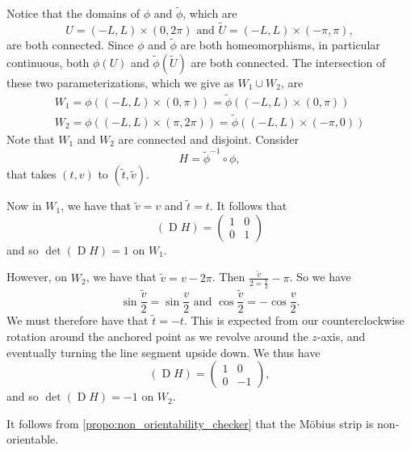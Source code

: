 \documentclass[notoc,notitlepage]{tufte-book}
\DeclareMathOperator{\D}{D}
\begin{document}
\begin{eg}
  \noindent
   Notice that the
  domains of $\phi$ and $\tilde{\phi}$, which are
  \begin{equation*}
    U = (-L, L) \times (0, 2 \pi) \text{ and } \tilde{U} = (-L, L) \times (-\pi, \pi),
  \end{equation*}
  are both connected. Since $\phi$ and $\tilde{\phi}$ are both homeomorphisms,
  in particular continuous, both $\phi(U)$ and $\tilde{\phi}(\tilde{U})$ are
  both connected. The intersection of these two parameterizations, which we give
  as $W_1 \cup W_2$, are
  \begin{gather*}
    W_1 = \phi((-L, L) \times (0, \pi)) = \tilde{\phi}((-L, L) \times (0, \pi)) \\
    W_2 = \phi((-L, L) \times (\pi, 2\pi)) = \tilde{\phi} ((-L, L) \times (-\pi, 0))
  \end{gather*}
  Note that $W_1$ and $W_2$ are connected and disjoint. Consider
  \begin{equation*}
    H = \tilde{\phi}^{-1} \circ \phi,
  \end{equation*}
  that takes $(t, v)$ to $(\tilde{t}, \tilde{v})$.

  Now in $W_1$, we have that $\tilde{v} = v$ and $\tilde{t} = t$. It follows
  that
  \begin{equation*}
    (\D H) = \begin{pmatrix} 1 & 0 \\ 0 & 1 \end{pmatrix}
  \end{equation*}
  and so $\det (\D H) = 1$ on $W_1$.

  However, on $W_2$, we have that $\tilde{v} = v - 2 \pi$. Then
  $\frac{\tilde{v}}{2 = \frac{v}{2}} - \pi$. So we have
  \begin{equation*}
    \sin \frac{\tilde{v}}{2} = \sin \frac{v}{2} \text{ and }
    \cos \frac{\tilde{v}}{2} = - \cos \frac{v}{2}.
  \end{equation*}
  We must therefore have that $\tilde{t} = -t$. This is expected from our
  counterclockwise rotation around the anchored point as we revolve around the
  $z$-axis, and eventually turning the line segment upside down. We thus have
  \begin{equation*}
    (\D H) = \begin{pmatrix} 1 & 0 \\ 0 & -1 \end{pmatrix},
  \end{equation*}
  and so $\det (\D H) = -1$ on $W_2$.

  It follows from \cref{propo:non_orientability_checker} that the M\"{o}bius
  strip is non-orientable.
\end{eg}
\end{document}
